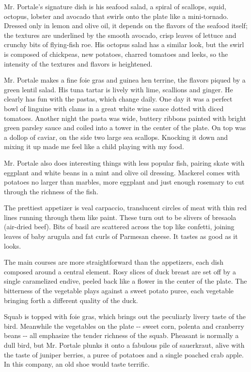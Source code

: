Mr. Portale's signature dish is his seafood salad, a spiral of scallops,
squid, octopus, lobster and avocado that swirls onto the plate like a
mini-tornado. Dressed only in lemon and olive oil, it depends on the
flavors of the seafood itself; the textures are underlined by the smooth
avocado, crisp leaves of lettuce and crunchy bits of flying-fish roe.
His octopus salad has a similar look, but the swirl is composed of
chickpeas, new potatoes, charred tomatoes and leeks, so the intensity of
the textures and flavors is heightened.

Mr. Portale makes a fine foie gras and guinea hen terrine, the flavors
piqued by a green lentil salad. His tuna tartar is lively with lime,
scallions and ginger. He clearly has fun with the pastas, which change
daily. One day it was a perfect bowl of linguine with clams in a great
white wine sauce dotted with diced tomatoes. Another night the pasta was
wide, buttery ribbons painted with bright green parsley sauce and coiled
into a tower in the center of the plate. On top was a dollop of caviar,
on the side two large sea scallops. Knocking it down and mixing it up
made me feel like a child playing with my food.

Mr. Portale also does interesting things with less popular fish, pairing
skate with eggplant and white beans in a mint and olive oil dressing.
Mackerel comes with potatoes no larger than marbles, more eggplant and
just enough rosemary to cut through the richness of the fish.

The prettiest appetizer is veal carpaccio, translucent circles of meat
with thin red lines running through them like paint. These turn out to
be slivers of bresaola (air-dried beef). Bits of basil are scattered
across the top like confetti, joining leaves of baby arugula and fat
curls of Parmesan cheese. It tastes as good as it looks.

The main courses are more straightforward than the appetizers, each dish
composed around a central element. Rosy slices of duck breast are set
off by a single caramelized endive, peeled back like a flower in the
center of the plate. The bitterness of the vegetable plays against a
sweet potato puree, each vegetable bringing forth a different quality of
the duck.

Squab is topped with foie gras, which brings out the peculiarly livery
taste of the bird. Meanwhile the vegetables on the plate -\/- sweet
corn, polenta and cranberry beans -\/- all emphasize the tender richness
of the squab. Pheasant is normally a dull bird, but Mr. Portale plunks
it onto a fabulous pile of sauerkraut, alive with the taste of juniper
berries, a puree of potatoes and a single poached crab apple. In this
company, an old shoe would taste terrific.

